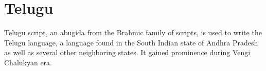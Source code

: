 \chapter{Telugu}

Telugu script, an abugida from the Brahmic family of scripts, is used to write the Telugu language, a language found in the South Indian state of Andhra Pradesh as well as several other neighboring states. It gained prominence during Vengi Chalukyan era. 

